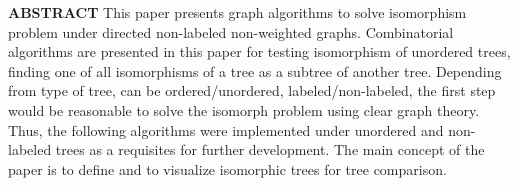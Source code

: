 {\bf\normalsize ABSTRACT}\newline
{
%
This paper presents graph algorithms to solve isomorphism problem under directed non-labeled non-weighted graphs. Combinatorial algorithms are presented in this paper for testing isomorphism of unordered trees, finding one of all isomorphisms of a tree as a subtree of another tree. Depending from type of tree, can be ordered/unordered, labeled/non-labeled, the first step would be reasonable to solve the isomorph problem using clear graph theory. Thus, the following algorithms were implemented under unordered and non-labeled trees as a requisites for further development. The main concept of the paper is to define and to visualize isomorphic trees for tree comparison.
} \vspace{2ex}
